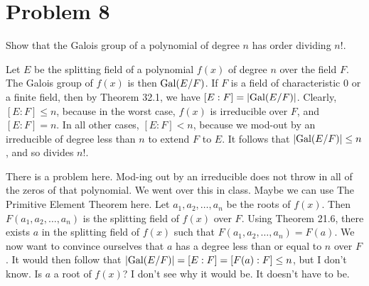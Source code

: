 \documentclass{article}
\begin{document}
%
%

%
%

\section*{Problem 8}

Show that the Galois group of a polynomial of degree $n$ has order dividing $n!$.

Let $E$ be the splitting field of a polynomial $f(x)$ of degree $n$
over the field $F$.  The Galois group of $f(x)$ is then $\mbox{Gal}(E/F)$.
If $F$ is a field of characteristic 0 or a finite field, then by
Theorem 32.1, we have $[E:F]=|\mbox{Gal}(E/F)|$.  Clearly, $[E:F]\leq n$,
because in the worst case, $f(x)$ is irreducible over $F$, and $[E:F]=n$.
In all other cases, $[E:F]<n$, because we mod-out by an irreducible of
degree less than $n$ to extend $F$ to $E$.
It follows that $|\mbox{Gal}(E/F)|\leq n$, and so divides $n!$.

There is a problem here.  Mod-ing out by an irreducible does not throw
in all of the zeros of that polynomial.  We went over this in class.
Maybe we can use The Primitive Element Theorem here.
Let $a_1,a_2,\dots,a_n$ be the roots of $f(x)$.
Then $F(a_1,a_2,\dots,a_n)$ is the splitting field of $f(x)$ over $F$.
Using Theorem 21.6, there exists $a$ in the splitting field of $f(x)$
such that $F(a_1,a_2,\dots,a_n)=F(a)$.  We now want to convince ourselves
that $a$ has a degree less than or equal to $n$ over $F$.  It would
then follow that $|\mbox{Gal}(E/F)|=[E:F]=[F(a):F]\leq n$, but I don't know.
Is $a$ a root of $f(x)$?  I don't see why it would be.  It doesn't have to be.
\end{document}

